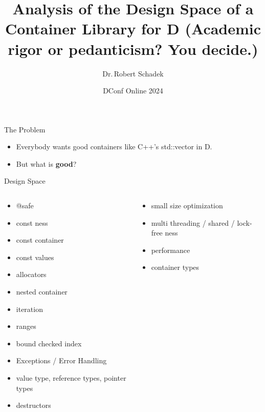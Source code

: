 \documentclass[aspectratio=169,notes]{beamer}
\title{Analysis of the Design Space of a Container Library for D (Academic rigor or pedanticism? You decide.)}
\date{DConf Online 2024}
\author{Dr.\,Robert Schadek}
\begin{document}
	\maketitle

	\begin{frame}[fragile]{The Problem}
		\begin{itemize}
			\item Everybody wants good containers like C++'s std::vector in D. 	
			\pause
			\item But what is \textbf{good}?
		\end{itemize}
	\end{frame}


	\begin{frame}[fragile]{Design Space}
		\begin{columns}[T]
		\begin{column}{0.49\textwidth}
		\begin{itemize}
			\item @safe
			\item const ness
			\item const container
			\item const values
			\item allocators
			\item nested container
			\item iteration
			\item ranges
			\item bound checked index
			\item Exceptions / Error Handling
			\item value type, reference types, pointer types
			\item destructors
		\end{itemize}
		\end{column}
		\begin{column}{0.49\textwidth}
		\begin{itemize}
			\item small size optimization
			\item multi threading / shared / lock-free ness
			\item performance
			\item container types
		\end{itemize}
		\end{column}
		\end{columns}
	\end{frame}
\end{document}
